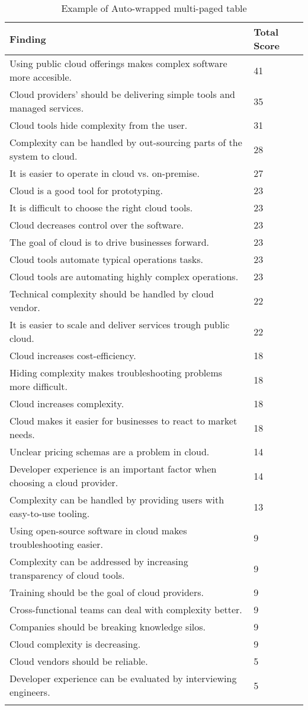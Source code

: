 
\renewcommand\arraystretch{1.5}%
\begin{longtable}{|p{10cm}|p{2cm}|}
\hline
\textbf{Finding}  & \textbf{Total Score} \\ \hline
\endhead
Using public cloud offerings makes complex software more accesible. & 41 \\ \hline
Cloud providers' should be delivering simple tools and managed services. & 35 \\ \hline
Cloud tools hide complexity from the user. & 31 \\ \hline
Complexity can be handled by out-sourcing parts of the system to cloud. & 28 \\ \hline
It is easier to operate in cloud vs. on-premise. & 27 \\ \hline
Cloud is a good tool for prototyping. & 23 \\ \hline
It is difficult to choose the right cloud tools. & 23 \\ \hline
Cloud decreases control over the software. & 23 \\ \hline
The goal of cloud is to drive businesses forward. & 23 \\ \hline
Cloud tools automate typical operations tasks. & 23 \\ \hline
Cloud tools are automating highly complex operations. & 23 \\ \hline
Technical complexity should be handled by cloud vendor. & 22 \\ \hline
It is easier to scale and deliver services trough public cloud. & 22 \\ \hline
Cloud increases cost-efficiency. & 18 \\ \hline
Hiding complexity makes troubleshooting problems more difficult. & 18 \\ \hline
Cloud increases complexity. & 18 \\ \hline
Cloud makes it easier for businesses to react to market needs. & 18 \\ \hline
Unclear pricing schemas are a problem in cloud. & 14 \\ \hline
Developer experience is an important factor when choosing a cloud provider. & 14 \\ \hline
Complexity can be handled by providing users with easy-to-use tooling. & 13 \\ \hline
Using open-source software in cloud makes troubleshooting easier. & 9 \\ \hline
Complexity can be addressed by increasing transparency of cloud tools. & 9 \\ \hline
Training should be the goal of cloud providers. & 9 \\ \hline
Cross-functional teams can deal with complexity better. & 9 \\ \hline
Companies should be breaking knowledge silos. & 9 \\ \hline
Cloud complexity is decreasing. & 9 \\ \hline
Cloud vendors should be reliable. & 5 \\ \hline
Developer experience can be evaluated by interviewing engineers. & 5 \\ \hline
\caption{Example of Auto-wrapped multi-paged table}
\label{tab:table1}
\end{longtable}

